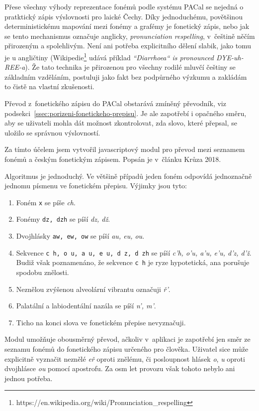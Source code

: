 Přese všechny výhody reprezentace fonémů podle systému PACal se nejedná o
pratktický zápis výslovnosti pro laické Čechy. Díky jednoduchému, povětšinou
deterministickému mapování mezi fonémy a grafémy je fonetický zápis, nebo jak
se tento mechanismus označuje anglicky, {\em pronunciation respelling},
v~češtině něčím přirozeným a spolehlivým. Není ani potřeba explicitního dělení
slabik, jako tomu je u angličtiny
(Wikipedie\footnote{https://en.wikipedia.org/wiki/Pronunciation\_respelling}
udává příklad {\em ``Diarrhoea`` is pronounced DYE-uh-REE-a}).
Že tato technika je přirozenou pro všechny rodilé mluvčí češtiny se základním vzděláním,
postuluji jako fakt bez podpůrného výzkumu a zakládám to čistě na vlastní
zkušenosti.

Převod z~fonetického zápisu do PACal obstarává zmíněný převodník, viz
podsekci~\ref{ssec:porizeni-fonetickeho-prepisu}. Je ale zapotřebí i opačného
směru, aby se uživateli mohla dát možnost zkontrolovat, zda slovo, které
přepsal, se uložilo se správnou výslovností.

Za tímto účelem jsem vytvořil javascriptový modul pro převod mezi seznamem
fonémů a českým fonetickým zápisem. Popsán je v~článku Krůza 2018\cite{biblio:KrPhoneticTranscription2018}.

Algoritmus je jednoduchý. Ve většině případů jeden foném odpovídá jednoznačně
jednomu písmenu ve fonetickém přepisu. Výjimky jsou tyto:
\begin{enumerate}
\item{Foném \texttt{x} se píše {\em ch}.}
\item{Fonémy \texttt{dz, dzh} se píší {\em dz, dž}.}
\item{Dvojhlásky \texttt{aw, ew, ow} se píší {\em au, eu, ou}.}
\item{
    Sekvence \texttt{c h, o u, a u, e u, d z, d zh} se píší
    {\em c'h, o'u, a'u, e'u, d'z, d'ž}.
    Budiž však poznamenáno, že sekvence \texttt{c h} je ryze hypotetická, ana
    porušuje spodobu znělosti.
}
\item{
    Neznělou zvýšenou alveolární vibrantu označuji {\em ř'}.
}
\item{
    Palatální a labiodentální nazála se píší {\em n', m'}.
}
\item{Ticho na konci slova ve fonetickém přepise nevyznačuji.}
\end{enumerate}

Modul umožňuje obousměrný převod, ačkoliv v~aplikaci je zapotřebí jen směr ze seznamu fonémů do
fonetického zápisu určeného pro člověka. Uživatel sice může explicitně vyznačit
neznělé {\em eř} oproti znělému, či posloupnost hlásek {\em o}, {\em u} oproti
dvojhlásce {\em ou} pomocí apostrofu. Za osm let provozu však tohoto nebylo ani
jednou potřeba.

